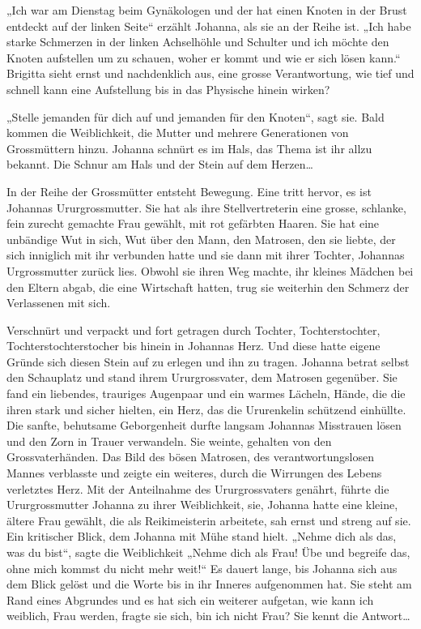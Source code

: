 \documentclass[10pt,titlepage,a5paper]{book}
\begin{document}
„Ich war am Dienstag beim Gynäkologen und der hat einen Knoten in der Brust entdeckt auf der linken Seite“ erzählt Johanna, als sie an der Reihe ist. „Ich habe starke Schmerzen in der linken Achselhöhle und Schulter und ich möchte den Knoten aufstellen um zu schauen, woher er kommt und wie er sich lösen kann.“ Brigitta sieht ernst und nachdenklich aus, eine grosse Verantwortung, wie tief und schnell kann eine Aufstellung bis in das Physische hinein wirken?

„Stelle jemanden für dich auf und jemanden für den Knoten“, sagt sie.
Bald kommen die Weiblichkeit, die Mutter und mehrere Generationen von Grossmüttern hinzu. Johanna schnürt es im Hals, das Thema ist ihr allzu bekannt. Die Schnur am Hals und der Stein auf dem Herzen\dots 

In der Reihe der Grossmütter entsteht Bewegung. Eine tritt hervor, es ist Johannas Ururgrossmutter. Sie hat als ihre Stellvertreterin eine grosse, schlanke, fein zurecht gemachte Frau gewählt, mit rot gefärbten Haaren. Sie hat eine unbändige Wut in sich, Wut über den Mann, den Matrosen, den sie liebte, der sich inniglich mit ihr verbunden hatte und sie dann mit ihrer Tochter, Johannas Urgrossmutter zurück lies. Obwohl sie ihren Weg machte, ihr kleines Mädchen bei den Eltern abgab, die eine Wirtschaft hatten, trug sie weiterhin den Schmerz der Verlassenen mit sich.

Verschnürt und verpackt und fort getragen durch Tochter, Tochterstochter, Tochterstochterstocher bis hinein in Johannas  Herz. Und diese hatte eigene Gründe sich diesen Stein auf zu erlegen und ihn zu tragen. Johanna betrat selbst den Schauplatz und stand ihrem Ururgrossvater, dem Matrosen gegenüber. Sie fand ein liebendes, trauriges Augenpaar und ein warmes Lächeln, Hände, die die ihren stark und sicher hielten, ein Herz, das die Ururenkelin schütz\-end einhüllte. Die sanfte, behutsame Geborgenheit durfte langsam Johannas Misstrauen lösen und den Zorn in Trauer verwandeln. Sie weinte, gehalten von den Grossvaterhänden. Das Bild des bösen Matrosen, des verantwortungslosen Mannes verblasste und zeigte ein weiteres, durch die Wirrungen des Lebens verletztes Herz. Mit der Anteilnahme des Ururgrossvaters genährt, führte die Ururgrossmutter Johanna zu ihrer Weiblichkeit, sie, Johanna hatte eine kleine, ältere Frau gewählt, die als Reikimeisterin arbeitete, sah ernst und streng auf sie. Ein kritischer Blick, dem Johanna mit Mühe stand hielt. „Nehme dich als das, was du bist“, sagte die Weiblichkeit „Nehme dich als Frau! Übe und begreife das, ohne mich kommst du nicht mehr weit!“ Es dauert lange, bis Johanna sich aus dem Blick gelöst und die Worte bis in ihr Inneres aufgenommen hat. Sie steht am Rand eines Abgrundes und es hat sich ein weiterer aufgetan, wie kann ich weiblich, Frau werden, fragte sie sich, bin ich nicht Frau? Sie kennt die Antwort\dots 
\end{document}
